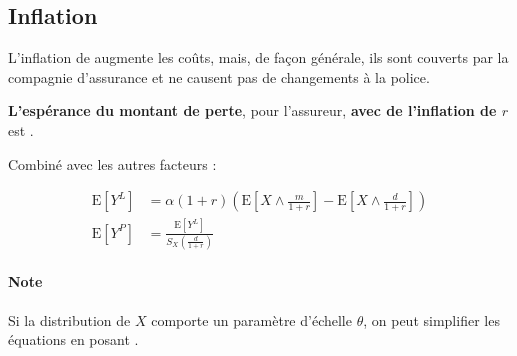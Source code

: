 \documentclass[french]{article}
\begin{document}
\begin{multicols*}{2}


\columnbreak
\subsection{Inflation}
\begin{definitionNOHFILL}[Inflation $r$]
L'inflation de  augmente les coûts, mais, de façon générale, ils sont couverts par la compagnie d'assurance et ne causent pas de changements à la police.
\end{definitionNOHFILL}

\begin{definitionNOHFILLsub}
\textbf{L'espérance du montant de perte}, pour l'assureur, \textbf{avec de l'inflation de $r$} est .

\bigskip

Combiné avec les autres facteurs :

\begin{align*}
	\text{E}\left[Y^{L}\right]		
	&=	\alpha(1 + r) \left(\text{E}\left[X \wedge \frac{m}{1 + r}\right]	-	\text{E}\left[X \wedge \frac{d}{1 + r}\right]\right)	\\
	\text{E}\left[Y^{P}\right]	
	&=	\frac{\text{E}[Y^{L}]}{S_{X}\left(\frac{d}{1 + r}\right)}
\end{align*}
\end{definitionNOHFILLsub}

\paragraph{Note}	Si la distribution de $X$ comporte un paramètre d'échelle $\theta$, on peut simplifier les équations en posant .




\end{multicols*}
\end{document}
